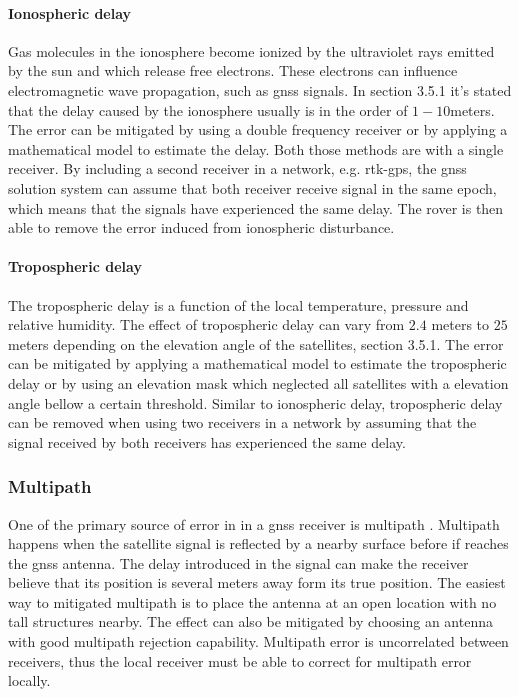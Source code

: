 \paragraph{Ionospheric delay}
Gas molecules in the ionosphere become ionized by the ultraviolet rays emitted by the sun and which release free electrons. These electrons can influence electromagnetic wave propagation, such as \gls{gnss} signals. In \citep{vik2014integrated} section 3.5.1 it's stated that the delay caused by the ionosphere usually is in the order of $1-10 $meters. The error can be mitigated by using a double frequency receiver or by applying a mathematical model to estimate the delay. Both those methods are with a single receiver. By including a second receiver in a network, e.g. \gls{rtk-gps}, the \gls{gnss} solution system can assume that both receiver receive signal in the same epoch, which means that the signals have experienced the same delay. The rover is then able to remove the error induced from ionospheric disturbance.
\paragraph{Tropospheric delay}
The tropospheric delay is a function of the local temperature, pressure and relative humidity. The effect of tropospheric delay can  vary from $2.4$ meters to $25$ meters depending on the elevation angle of the satellites,\citep{vik2014integrated} section 3.5.1. The error can be mitigated by applying a mathematical model to estimate the tropospheric delay or by using an elevation mask which neglected all satellites with a elevation angle bellow a certain threshold. Similar to ionospheric delay, tropospheric delay can be removed when using two receivers in a network by assuming that the signal received by both receivers has experienced the same delay. 

\subsubsection{Multipath}
One of the primary source of error in in a \gls{gnss} receiver is multipath \citep{misra2011global}. Multipath happens when the satellite signal is reflected by a nearby surface before if reaches the \gls{gnss} antenna. The delay introduced in the signal can make the receiver believe that its position is several meters away form its true position. The easiest way to mitigated multipath is to place the antenna at an open location with no tall structures nearby. The effect can also be mitigated by choosing an antenna with good multipath rejection capability. Multipath error is uncorrelated between receivers, thus the local receiver must be able to correct for multipath error locally.

